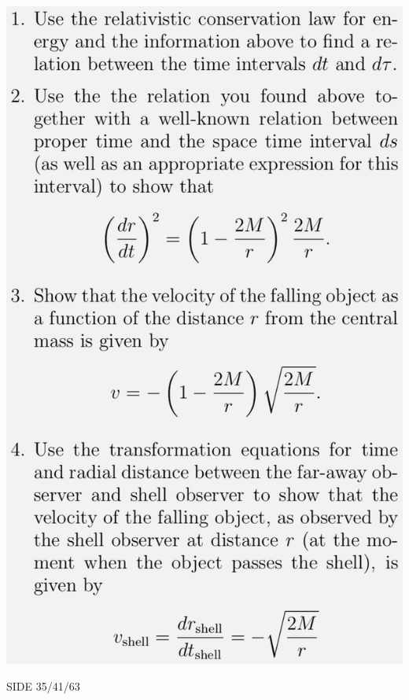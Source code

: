 \documentclass{beamer}
\begin{document}
{
\centerline{\includegraphics[scale=0.32]{media/2c4.png}}
}{SIDE 35/41/63}
\end{document}
